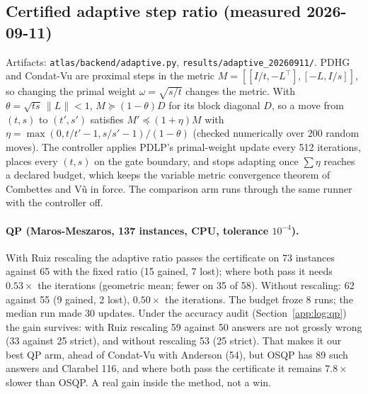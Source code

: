 \subsection{Certified adaptive step ratio (measured 2026-09-11)}
\label{app:log:adaptive}

Artifacts: \texttt{atlas/backend/adaptive.py}, \texttt{results/adaptive\_20260911/}.
PDHG and Condat-Vu are proximal steps in the metric
$M = [[I/t, -L^\top], [-L, I/s]]$, so changing the primal weight
$\omega = \sqrt{s/t}$ changes the metric. With $\theta = \sqrt{ts}\,\|L\| < 1$,
$M \succeq (1-\theta)D$ for its block diagonal $D$, so a move from $(t,s)$ to
$(t',s')$ satisfies $M' \preceq (1+\eta)M$ with
$\eta = \max(0, t/t'-1, s/s'-1)/(1-\theta)$ (checked numerically over 200
random moves). The controller applies PDLP's primal-weight update every 512
iterations, places every $(t,s)$ on the gate boundary, and stops adapting
once $\sum\eta$ reaches a declared budget, which keeps the variable metric
convergence theorem of Combettes and V\~u in force. The comparison arm runs
through the same runner with the controller off.

\paragraph{QP (Maros-Meszaros, 137 instances, CPU, tolerance $10^{-4}$).}
With Ruiz rescaling the adaptive ratio passes the certificate on 73
instances against 65 with the fixed ratio (15 gained, 7 lost); where both
pass it needs $0.53\times$ the iterations (geometric mean; fewer on 35 of 58).
Without rescaling: 62 against 55 (9 gained, 2 lost), $0.50\times$ the
iterations. The budget froze 8 runs; the median run made 30 updates. Under the
accuracy audit (Section~\ref{app:log:qp}) the gain survives: with Ruiz
rescaling 59 against 50 answers are not grossly wrong (33 against 25 strict),
and without rescaling 53 (25 strict). That makes it our best QP arm, ahead of
Condat-Vu with Anderson (54), but OSQP has 89 such answers and Clarabel 116,
and where both pass the certificate it remains $7.8\times$ slower than OSQP. A
real gain inside the method, not a win.

